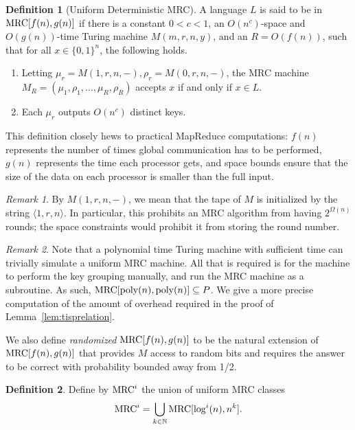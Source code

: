 \documentclass[11pt]{article}
\theoremstyle{definition}
\newtheorem{defn}{Definition}
\theoremstyle{remark}
\newtheorem{remark}{Remark}
\newcommand{\N}{\mathbb{N}}
\newcommand{\mrc}{\textup{MRC}}
\begin{document}
\begin{defn}[Uniform Deterministic MRC]

A language $L$ is said to be in $\mrc[f(n),g(n)]$ if there is a constant $0 < c
< 1$, an $O(n^c)$-space and $O(g(n))$-time Turing machine $M(m, r, n, y)$, and
an $R = O(f(n))$, such that for all $x \in \{ 0,1 \}^n$, the following holds.

\begin{enumerate}
\item Letting $\mu_r = M(1, r, n, -), \rho_r = M(0, r, n, -)$, the MRC machine
$M_R = (\mu_1, \rho_1, \dots, \mu_R, \rho_R)$ accepts $x$ if and only if $x \in
L$.

\item Each $\mu_r$ outputs $O(n^c)$ distinct keys.
\end{enumerate}

\end{defn}

This definition closely hews to practical MapReduce computations:  $f(n)$
represents the number of times global communication has to be performed, $g(n)$
represents the  time each processor gets, and space bounds ensure that the size
of the data on each processor is  smaller than the full input.

\begin{remark}
By $M(1, r, n, -)$, we mean that the tape of $M$ is initialized by the string
$\langle 1, r, n \rangle$. In particular, this prohibits an MRC algorithm from
having $2^{\Omega(n)}$ rounds; the space constraints would prohibit it from
storing the round number.
\end{remark}

\begin{remark}\label{remark:timebound}
Note that a polynomial time Turing machine with sufficient time can trivially
simulate a uniform MRC machine. All that is required is for the machine to
perform the key grouping manually, and run the MRC machine as a subroutine. As
such, $\mrc[\text{poly}(n), \text{poly}(n)] \subseteq P$. We give a more precise
computation of the amount of overhead required in the proof of
Lemma~\ref{lem:tisprelation}.
\end{remark}

We also define \emph{randomized} $\mrc[f(n), g(n)]$ to be the natural extension
of $\mrc[f(n), g(n)]$ that provides $M$ access to random bits and requires the
answer to be correct with probability bounded away from 1/2.

\begin{defn}
Define by $\mrc^i$ the union of uniform MRC classes
\[
   \mrc^i = \bigcup_{k\in\N}\mrc[\log^i(n),n^k].
\]
\end{defn}
\end{document}
